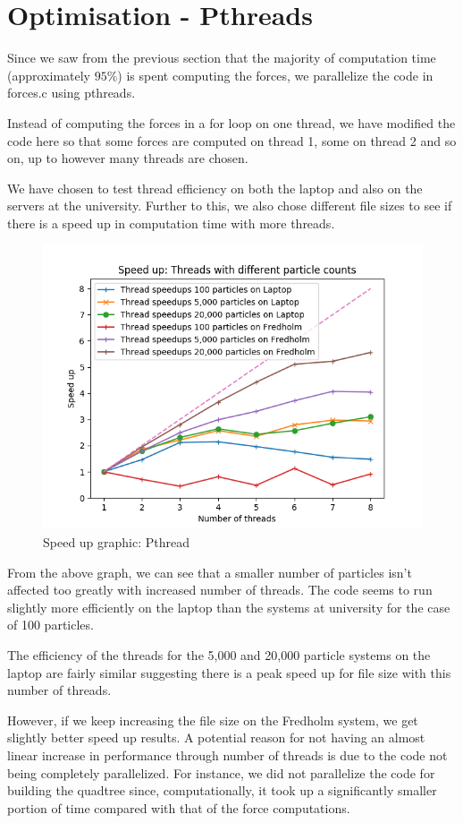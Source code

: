 \section{Optimisation - Pthreads}
Since we saw from the previous section that the majority of computation time (approximately $95\%$) is spent computing the forces, we parallelize the code in forces.c using pthreads.

Instead of computing the forces in a for loop on one thread, we have modified the code here so that some forces are computed on thread 1, some on thread 2 and so on, up to however many threads are chosen.

We have chosen to test thread efficiency on both the laptop and also on the servers at the university. Further to this, we also chose different file sizes to see if there is a speed up in computation time with more threads.

\begin{figure}[htb]
  \begin{center}
    \includegraphics[width = 12cm]{../images/compute_pthreads.png}
    \caption{Speed up graphic: Pthread}
  \end{center}
\end{figure}
From the above graph, we can see that a smaller number of particles isn't affected too greatly with increased number of threads. The code seems to run slightly more efficiently on the laptop than the systems at university for the case of 100 particles.

The efficiency of the threads for the 5,000 and 20,000 particle systems on the laptop are fairly similar suggesting there is a peak speed up for file size with this number of threads.

However, if we keep increasing the file size on the Fredholm system, we get slightly better speed up results. A potential reason for not having an almost linear increase in performance through number of threads is due to the code not being completely parallelized. For instance, we did not parallelize the code for building the quadtree since, computationally, it took up a significantly smaller portion of time compared with that of the force computations.
